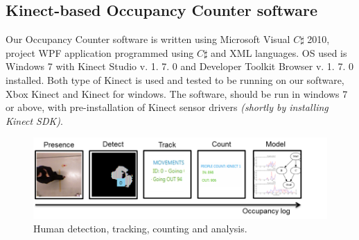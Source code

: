 \subsection{Kinect-based Occupancy Counter software}
Our  Occupancy Counter software is written using Microsoft Visual $C\sharp$ 2010,  project WPF application programmed using $C\sharp$ and XML languages.  OS used is Windows 7 with Kinect Studio v. 1. 7. 0 and Developer Toolkit Browser v. 1. 7. 0 installed.  Both type of Kinect is used and tested to be running on our software,  Xbox Kinect and Kinect for windows.  The software,  should be run in windows 7 or above,  with pre-installation of Kinect sensor drivers \emph{(shortly by installing Kinect SDK)}.

 \begin{figure}[!ht]
  \begin{center}
	  	\includegraphics[width=0.9\columnwidth]{./images/112200.png}
  \end{center}
  \caption{Human detection,  tracking, counting and analysis.}
\end{figure}

